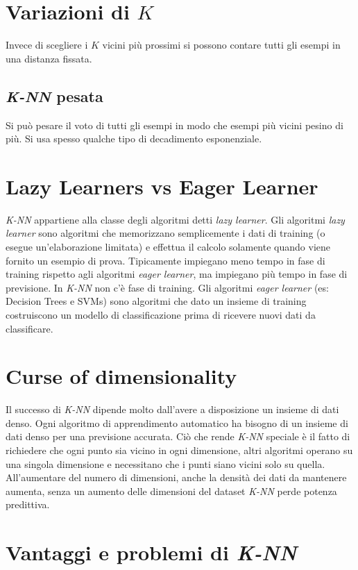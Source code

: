 \section{Variazioni di $K$}
Invece di scegliere i $K$ vicini pi\`u prossimi si possono contare tutti gli esempi in una distanza fissata.

	\subsection{\emph{K-NN} pesata}
	Si pu\`o pesare il voto di tutti gli esempi in modo che esempi pi\`u vicini pesino di pi\`u.
	Si usa spesso qualche tipo di decadimento esponenziale.

\section{Lazy Learners vs Eager Learner}
\emph{K-NN} appartiene alla classe degli algoritmi detti \emph{lazy learner}.
Gli algoritmi \emph{lazy learner} sono algoritmi che memorizzano semplicemente i dati di training (o esegue un'elaborazione limitata) e effettua il calcolo solamente quando viene fornito un esempio di prova. 
Tipicamente impiegano meno tempo in fase di training rispetto agli algoritmi \emph{eager learner}, ma impiegano più tempo in fase di previsione. 
In \emph{K-NN} non c'\`e fase di training.
Gli algoritmi \emph{eager learner} (es: Decision Trees e SVMs) sono algoritmi che dato un insieme di training costruiscono un modello di classificazione prima di ricevere nuovi dati da classificare.


\section{Curse of dimensionality}

Il successo di \emph{K-NN} dipende molto dall'avere a disposizione un insieme di dati denso. 
Ogni algoritmo di apprendimento automatico ha bisogno di un insieme di dati denso per una previsione accurata. 
Ci\`o che rende \emph{K-NN} speciale è il fatto di richiedere che ogni punto sia vicino in ogni dimensione, altri algoritmi operano su una singola dimensione e necessitano che i punti siano vicini solo su quella.
All'aumentare del numero di dimensioni, anche la densit\`a dei dati da mantenere aumenta, senza un aumento delle dimensioni del dataset \emph{K-NN} perde potenza predittiva.


\section{Vantaggi e problemi di \emph{K-NN}}
	
